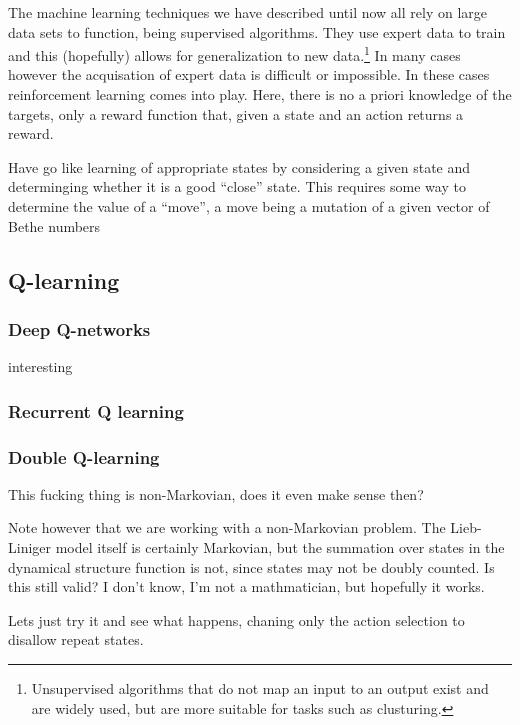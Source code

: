 \documentclass[11pt, a4paper]{report} %
\begin{document}
The machine learning techniques we have described until now all rely on large data sets to function, being supervised algorithms.
They use expert data to train and this (hopefully) allows for generalization to new data.\footnote{Unsupervised algorithms that do not map an input to an output exist and are widely used, but are more suitable for tasks such as clusturing.}
In many cases however the acquisation of expert data is difficult or impossible.
In these cases reinforcement learning comes into play.
Here, there is no a priori knowledge of the targets, only a reward function that, given a state and an action returns a reward.

Have go like learning of appropriate states by considering a given state and determinging whether it is a good ``close'' state.
This requires some way to determine the value of a ``move'', a move being a mutation of a given vector of Bethe numbers\cite{Silver2017}

\subsection{Q-learning}

\subsubsection{Deep Q-networks}

interesting\cite{mnih13_playin_atari_with_deep_reinf_learn,lillicrap15_contin_contr_with_deep_reinf_learn}

\subsubsection{Recurrent Q learning}
\cite{hausknecht15_deep_recur_q_learn_partial_obser_mdps}
\subsubsection{Double Q-learning}
\cite{hasselt15_deep_reinf_learn_with_doubl_q_learn}

This fucking thing is non-Markovian, does it even make sense then?

Note however that we are working with a non-Markovian problem.
The Lieb-Liniger model itself is certainly Markovian, but the summation over states in the dynamical structure function is not, since states may not be doubly counted.
Is this still valid?
I don't know, I'm not a mathmatician, but hopefully it works.

Lets just try it and see what happens, chaning only the action selection to disallow repeat states.
\end{document}

